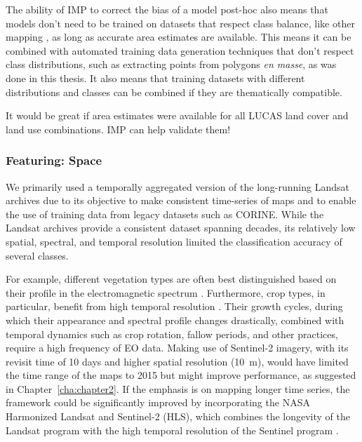         
        The ability of IMP to correct the bias of a model post-hoc also means that models don't need to be trained on datasets that respect class balance, like other mapping \citep{waldner2016towards,kleinewillinghofer2022unbiased}, as long as accurate area estimates are available. This means it can be combined with automated training data generation techniques that don't respect class distributions, such as extracting points from polygons \textit{en masse}, as was done in this thesis. It also means that training datasets with different distributions and classes can be combined if they are thematically compatible.

        It would be great if area estimates were available for all LUCAS land cover and land use combinations. IMP can help validate them!

        \citep{sumbul2021bigearthnet}

        \subsubsection{Featuring: Space}
        
        We primarily used a temporally aggregated version of the long-running Landsat archives due to its objective to make consistent time-series of maps and to enable the use of training data from legacy datasets such as CORINE. While the Landsat archives provide a consistent dataset spanning decades, its relatively low spatial, spectral, and temporal resolution limited the classification accuracy of several classes. 
        
        For example, different vegetation types are often best distinguished based on their profile in the electromagnetic spectrum \citep{xu2021towards,CITE, CITE}. Furthermore, crop types, in particular, benefit from high temporal resolution \citep{esch2014differentiation,xu2021towards}. Their growth cycles, during which their appearance and spectral profile changes drastically, combined with temporal dynamics such as crop rotation, fallow periods, and other practices, require a high frequency of EO data. Making use of Sentinel-2 imagery, with its revisit time of 10 days and higher spatial resolution (10~m), would have limited the time range of the maps to 2015 but might improve performance, as suggested in Chapter\@~\ref{cha:chapter2}. If the emphasis is on mapping longer time series, the framework could be significantly improved by incorporating the NASA Harmonized Landsat and Sentinel-2 (HLS), which combines the longevity of the Landsat program with the high temporal resolution of the Sentinel program \citep{claverie2018harmonized}.
        
